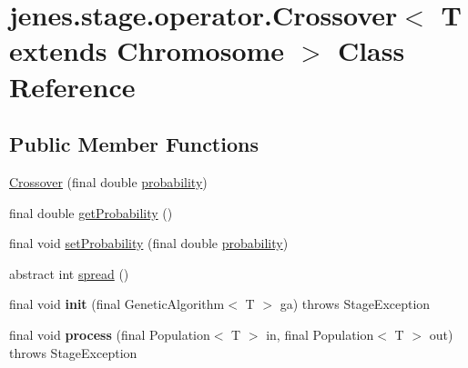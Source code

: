 \hypertarget{classjenes_1_1stage_1_1operator_1_1_crossover_3_01_t_01extends_01_chromosome_01_4}{
\section{jenes.stage.operator.Crossover$<$ T extends Chromosome $>$ Class Reference}
\label{classjenes_1_1stage_1_1operator_1_1_crossover_3_01_t_01extends_01_chromosome_01_4}
}
\subsection*{Public Member Functions}
\begin{CompactItemize}
\item 
\hyperlink{classjenes_1_1stage_1_1operator_1_1_crossover_3_01_t_01extends_01_chromosome_01_4_2287f5646b08b9c3167934ee620f2d6e}{Crossover} (final double \hyperlink{classjenes_1_1stage_1_1operator_1_1_crossover_3_01_t_01extends_01_chromosome_01_4_2b4aec7312a223ba84862f7848b14542}{probability})
\item 
final double \hyperlink{classjenes_1_1stage_1_1operator_1_1_crossover_3_01_t_01extends_01_chromosome_01_4_86b60220061c4bf1f0eaae66d22f5eb8}{getProbability} ()
\item 
final void \hyperlink{classjenes_1_1stage_1_1operator_1_1_crossover_3_01_t_01extends_01_chromosome_01_4_c491f1c3b3b8c074f3b59bc33f65f389}{setProbability} (final double \hyperlink{classjenes_1_1stage_1_1operator_1_1_crossover_3_01_t_01extends_01_chromosome_01_4_2b4aec7312a223ba84862f7848b14542}{probability})
\item 
abstract int \hyperlink{classjenes_1_1stage_1_1operator_1_1_crossover_3_01_t_01extends_01_chromosome_01_4_8bb995f2cf77073b79c9276ee3e8535d}{spread} ()
\item 
\hypertarget{classjenes_1_1stage_1_1operator_1_1_crossover_3_01_t_01extends_01_chromosome_01_4_c0b5d0219d2938f7756e616d04039ae0}{
final void \textbf{init} (final GeneticAlgorithm$<$ T $>$ ga)  throws StageException }
\label{classjenes_1_1stage_1_1operator_1_1_crossover_3_01_t_01extends_01_chromosome_01_4_c0b5d0219d2938f7756e616d04039ae0}

\item 
\hypertarget{classjenes_1_1stage_1_1operator_1_1_crossover_3_01_t_01extends_01_chromosome_01_4_c14c88e86762023813c69bee4c31d7ea}{
final void \textbf{process} (final Population$<$ T $>$ in, final Population$<$ T $>$ out)  throws StageException }
\label{classjenes_1_1stage_1_1operator_1_1_crossover_3_01_t_01extends_01_chromosome_01_4_c14c88e86762023813c69bee4c31d7ea}

\end{CompactItemize}
